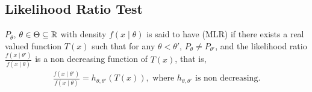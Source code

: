 \subsection{Likelihood Ratio Test}

\begin{definition}
    $P_{\theta}$, $\theta \in \Theta \subseteq \mathbb{R}$ with density $f(x \mid \theta)$ is said to have  (MLR) if there exists a real valued function $T(x)$ such that for any $\theta < \theta'$, $P_{\theta} \neq P_{\theta'}$, and the likelihood ratio $\frac{f(x \mid \theta')}{f(x \mid \theta)}$ is a non decreasing function of $T(x)$, that is,
    \begin{align}
        \frac{f(x \mid \theta')}{f(x \mid \theta)} = h_{\theta,\theta'}(T(x)), \text{ where } h_{\theta,\theta'} \text{ is non decreasing}.
    \end{align}
\end{definition}